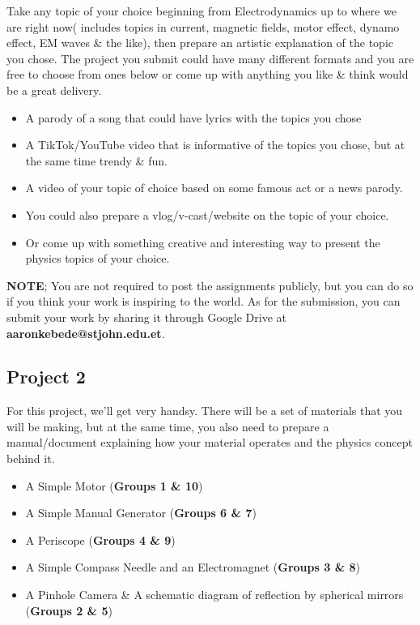 \documentclass[11pt,addpoints]{exam}
\begin{document}
	\begin{questions}
		\question Take any topic of your choice beginning from Electrodynamics up to where we are right now( includes topics in current, magnetic fields, motor effect, dynamo effect, EM waves \& the like), then prepare an artistic explanation of the topic you chose. The project you submit could have many different formats and you are free to choose from ones below or come up with anything you like \& think would be a great delivery.
		\begin{itemize}
			\item A parody of a song that could have lyrics with the topics you chose
			\item A TikTok/YouTube video that is informative of the topics you chose, but at the same time trendy \& fun.
			\item A video of your topic of choice based on some famous act or a news parody.
			\item You could also prepare a vlog/v-cast/website on the topic of your choice.
			\item Or come up with something creative and interesting way to present the physics topics of your choice.
		\end{itemize}
		\textbf{NOTE}; You are not required to post the assignments publicly, but you can do so if you think your work is inspiring to the world. As for the submission, you can submit your work by sharing it through Google Drive at \textbf{aaronkebede@stjohn.edu.et}.
		\begin{center}
			\subsection*{Project 2}
		\end{center}
		\question For this project, we'll get very handsy. There will be a set of materials that you will be making, but at the same time, you also need to prepare a manual/document explaining how your material operates and the physics concept behind it.
		\begin{itemize}
			\item A Simple Motor (\textbf{Groups 1 \& 10})
			\item A Simple Manual Generator (\textbf{Groups 6 \& 7})
			\item A Periscope (\textbf{Groups 4 \& 9})
			\item A Simple Compass Needle and an Electromagnet (\textbf{Groups 3 \& 8})
			\item A Pinhole Camera \& A schematic diagram of reflection by spherical mirrors (\textbf{Groups 2 \& 5})
		\end{itemize}

\end{questions}
\end{document}
